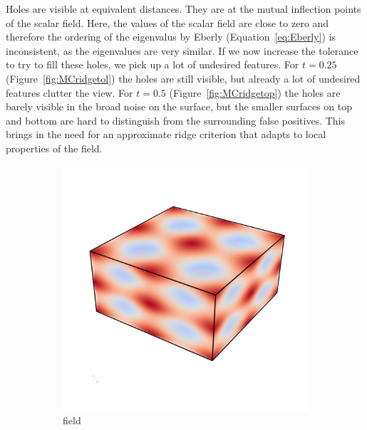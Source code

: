 Holes are visible at equivalent distances. They are at the mutual
inflection points of the scalar field. Here, the values of the scalar
field are close to zero and therefore the ordering of the eigenvalus by
Eberly (Equation~\ref{eq:Eberly}) is inconsistent, as the eigenvalues
are very similar. If we now increase the tolerance to try to fill these
holes, we pick up a lot of undesired features. For $t=0.25$
(Figure~\ref{fig:MCridgetol}) the holes are still visible, but already a
lot of undesired features clutter the view. For $t=0.5$
(Figure~\ref{fig:MCridgetop}) the holes are barely visible in the broad
noise on the surface, but the smaller surfaces on top and bottom are
hard to distinguish from the surrounding false positives. This brings in
the need for an approximate ridge criterion that adapts to local
properties of the field.
\begin{figure}
    \begin{subfigure}[b]{0.49\textwidth}
        \includegraphics[width=\textwidth]{Images/sfield.png}
        \caption{field}
        \label{fig:sfield}
    \end{subfigure}
    \begin{subfigure}[b]{0.49\textwidth}

\end{subfigure}
\end{figure}
